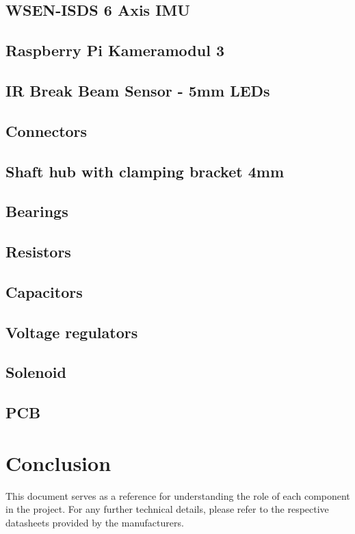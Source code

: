 \documentclass[a4paper,12pt]{article}
\begin{document}
  \subsection*{WSEN-ISDS 6 Axis IMU}

  \subsection*{Raspberry Pi Kameramodul 3}

  \subsection*{IR Break Beam Sensor - 5mm LEDs}

  \subsection*{Connectors}

  \subsection*{Shaft hub with clamping bracket 4mm}

  \subsection*{Bearings}

  \subsection*{Resistors}

  \subsection*{Capacitors}

  \subsection*{Voltage regulators}

  \subsection*{Solenoid}

  \subsection*{PCB}

  \section*{Conclusion}

  This document serves as a reference for understanding the role of each
  component in the project. For any further technical details, please
  refer to the respective datasheets provided by the manufacturers.

   
\end{document}
